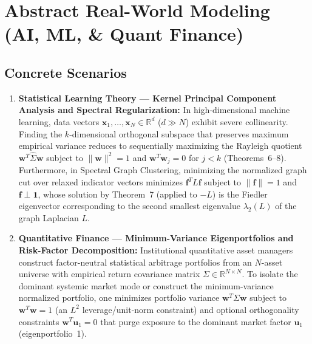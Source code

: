 \documentclass[11pt, letterpaper]{article}
\theoremstyle{definition}
\theoremstyle{remark}
\newcommand{\R}{\mathbb{R}}
\begin{document}
\section{Abstract Real-World Modeling (AI, ML, \& Quant Finance)}

\subsection{Concrete Scenarios}
\begin{enumerate}[label=\textbf{Scenario \arabic*:}]
    \item \textbf{Statistical Learning Theory — Kernel Principal Component Analysis and Spectral Regularization:}
    In high-dimensional machine learning, data vectors $\mathbf{x}_1, \dots, \mathbf{x}_N \in \R^d$ ($d \gg N$) exhibit severe collinearity. Finding the $k$-dimensional orthogonal subspace that preserves maximum empirical variance reduces to sequentially maximizing the Rayleigh quotient $\mathbf{w}^T \hat{\Sigma} \mathbf{w}$ subject to $\|\mathbf{w}\|^2 = 1$ and $\mathbf{w}^T \mathbf{w}_j = 0$ for $j < k$ (Theorems~6–8). Furthermore, in Spectral Graph Clustering, minimizing the normalized graph cut over relaxed indicator vectors minimizes $\mathbf{f}^T L \mathbf{f}$ subject to $\|\mathbf{f}\|=1$ and $\mathbf{f} \perp \mathbf{1}$, whose solution by Theorem~7 (applied to $-L$) is the Fiedler eigenvector corresponding to the second smallest eigenvalue $\lambda_2(L)$ of the graph Laplacian $L$.

    \item \textbf{Quantitative Finance — Minimum-Variance Eigenportfolios and Risk-Factor Decomposition:}
    Institutional quantitative asset managers construct factor-neutral statistical arbitrage portfolios from an $N$-asset universe with empirical return covariance matrix $\Sigma \in \R^{N \times N}$. To isolate the dominant systemic market mode or construct the minimum-variance normalized portfolio, one minimizes portfolio variance $\mathbf{w}^T \Sigma \mathbf{w}$ subject to $\mathbf{w}^T \mathbf{w} = 1$ (an $L^2$ leverage/unit-norm constraint) and optional orthogonality constraints $\mathbf{w}^T \mathbf{u}_1 = 0$ that purge exposure to the dominant market factor $\mathbf{u}_1$ (eigenportfolio~1).


\end{enumerate}
\end{document}
